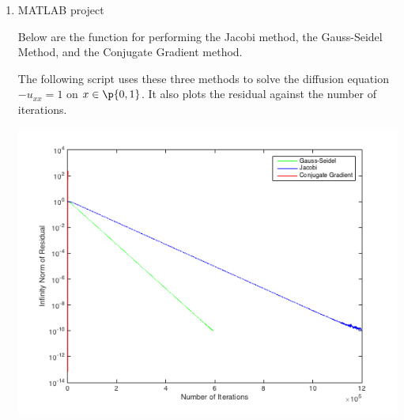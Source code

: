 \documentclass[11pt]{article}
\begin{document}
\begin{enumerate}
\begin{enumerate}
\begin{proof}
\begin{align*}
                        &= \lim{k \to \infty}{\frac{1}{x_k - \xi}\p{\frac{\frac{1}{2}(x_k - \xi) f''(\xi) + O\p{(x_k - \xi)^2}}{f'(\xi) + (x_k - \xi)f''(\xi) + O((x_k - \xi)^2)}}} \\
                        &= \lim{k \to \infty}{\frac{\frac{1}{2}f''(\xi) + O\p{x_k - \xi}}{f'(\xi) + (x_k - \xi)f''(\xi) + O((x_k - \xi)^2)}} \\
                        \intertext{Taking the limit}
                        &= \frac{1}{2} \frac{f''(\xi)}{f'(\xi)}
                    \end{align*}
                    Now going back to the original limit
                    \begin{align*}
                        \lim{k \to \infty}{\frac{x_{k+1} - \xi}{(x_k - \xi)^3}} &= \frac{f''(\xi)}{f'(\xi)} \lim{k \to \infty}{\frac{y_k - \xi}{(x_k - \xi)^2}} \\
                        \lim{k \to \infty}{\frac{x_{k+1} - \xi}{(x_k - \xi)^3}} &= \frac{1}{2} \p{\frac{f''(\xi)}{f'(\xi)}}^2 \\
                    \end{align*}
                \end{proof}
        \end{enumerate}

    \item %
        MATLAB project

        Below are the function for performing the 
        Jacobi method, the Gauss-Seidel Method, and the Conjugate Gradient
        method.
        
        
        

        The following script uses these three methods to solve the diffusion
        equation $-u_{xx} = 1$ on $x \in \p{0, 1}$.
        It also plots the residual against the number of iterations.
        
        \begin{center}
            \includegraphics[scale=.7]{Figures/05_10_1.png}
        \end{center}


\end{enumerate}
\end{document}
